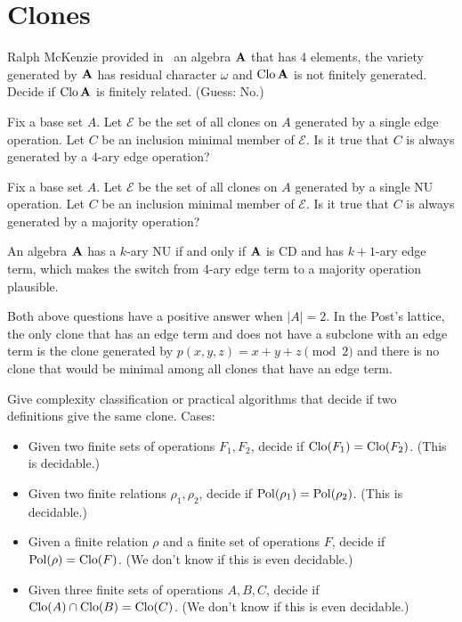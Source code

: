 \section{Clones}
\begin{question} Ralph McKenzie provided
  in~\cite{mckenzie-residual-bounds} an algebra
  ${\mathbf{A}}$ that has 4 elements, the variety generated by ${\mathbf{A}}$ has residual
  character $\omega$ and $\operatorname{Clo} {\mathbf{A}}$ is not finitely generated. Decide if
  $\operatorname{Clo} {\mathbf{A}}$ is finitely related. (Guess: No.)
\end{question}

\begin{question} Fix a base set $A$. Let $\mathcal E$ 
  be the set of all clones on $A$ generated by a single edge operation. Let $C$
  be an inclusion minimal member of $\mathcal E$. Is it true that $C$ is always
  generated by a 4-ary edge operation?
\end{question}
\begin{question} Fix a base set $A$. Let $\mathcal E$ 
  be the set of all clones on $A$ generated by a single NU operation. Let $C$
  be an inclusion minimal member of $\mathcal E$. Is it true that $C$ is always
  generated by a majority operation?
\end{question}

\begin{context}
  An algebra ${\mathbf{A}}$ has a $k$-ary NU if and only if ${\mathbf{A}}$ is CD and has
  $k+1$-ary edge term, which makes the switch from 4-ary edge term to a
  majority operation plausible.

  Both above questions have a positive answer when $|A|=2$. In the Post's
  lattice, the only clone that has an edge term and does not have a subclone
  with an edge term is the clone generated by $p(x,y,z)=x+y+z\pmod 2$ and there
  is no clone that would be minimal among all clones that have an edge term.
\end{context}

\begin{question}
  Give complexity classification or practical algorithms that decide if two definitions give the same clone. Cases:
  \begin{itemize}
    \item Given two finite sets of operations $F_1, F_2$, decide if
      $\operatorname{Clo}(F_1)=\operatorname{Clo}(F_2)$. (This is decidable.)
    \item Given two finite relations $\rho_1, \rho_2$, decide if
      $\operatorname{Pol}(\rho_1)=\operatorname{Pol}(\rho_2)$. (This is decidable.)
    \item Given a finite relation $\rho$ and a finite set of operations $F$,
      decide if $\operatorname{Pol}(\rho)=\operatorname{Clo}(F)$. (We don't know if this is even
      decidable.)
    \item Given three finite sets of operations $A, B, C$, decide if 
      $\operatorname{Clo}(A)\cap \operatorname{Clo}(B)=\operatorname{Clo}(C)$. (We don't know if this is even
      decidable.)
  \end{itemize}
\end{question}

